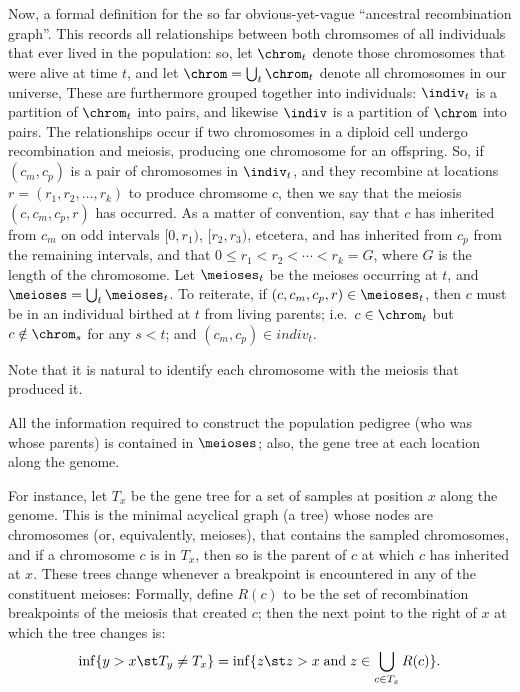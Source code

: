 Now, a formal definition for the so far obvious-yet-vague ``ancestral recombination graph''.
This records all relationships between both chromsomes of all individuals that ever lived in the population:
so, let $\chrom_t$ denote those chromosomes that were alive at time $t$,
and let $\chrom = \bigcup_t \chrom_t$ denote all chromosomes in our universe,
These are furthermore grouped together into individuals:
$\indiv_t$ is a partition of $\chrom_t$ into pairs, and likewise $\indiv$ is a partition of $\chrom$ into pairs.
The relationships occur if two chromosomes in a diploid cell undergo recombination and meiosis,
producing one chromosome for an offspring.
So, if $(c_m,c_p)$ is a pair of chromosomes in $\indiv_t$,
and they recombine at locations $r=(r_1,r_2,\ldots,r_k)$
to produce chromsome $c$,
then we say that the meiosis $(c,c_m,c_p,r)$ has occurred.
As a matter of convention, say that $c$ has inherited from $c_m$ 
on odd intervals $[0,r_1)$, $[r_2,r_3)$, etcetera,
and has inherited from $c_p$ from the remaining intervals,
and that $0 \le r_1 < r_2 < \cdots < r_k = G$, where $G$ is the length of the chromosome.
Let $\meioses_t$ be the meioses occurring at $t$,
and $\meioses = \bigcup_t \meioses_t$.
To reiterate, if $(c,c_m,c_p,r) \in \meioses_t$, then
$c$ must be in an individual birthed at $t$ from living parents; 
i.e.\ $c \in \chrom_t$ but $c \notin \chrom_s$ for any $s<t$;
and $(c_m,c_p) \in indiv_t$.

Note that it is natural to identify each chromosome with the meiosis that produced it.

All the information required to construct the population pedigree
(who was whose parents) is contained in $\meioses$;
also, the gene tree at each location along the genome.

For instance, let $T_x$ be the gene tree for a set of samples at position $x$ along the genome.
This is the minimal acyclical graph (a tree) whose nodes are chromosomes (or, equivalently, meioses), 
that contains the sampled chromosomes,
and if a chromosome $c$ is in $T_x$, then so is the parent of $c$ at which $c$ has inherited at $x$.
These trees change whenever a breakpoint is encountered in any of the constituent meioses:
Formally, define $R(c)$ to be the set of recombination breakpoints of the meiosis that created $c$;
then the next point to the right of $x$ at which the tree changes is:
\begin{align}
  \inf\{ y > x \st T_y \neq T_x \} = \inf\{ z \st z > x \; \text{and} \; z \in \bigcup_{c\in T_x} R(c) \} .
\end{align}



